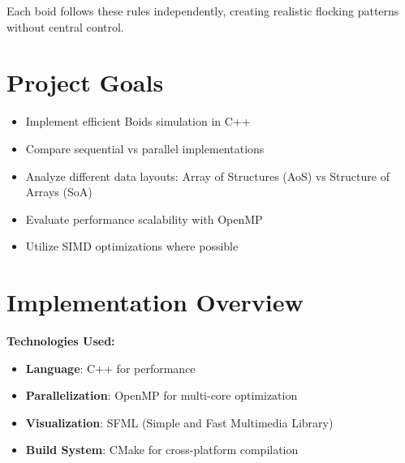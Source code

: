 \vspace{0.5cm}
Each boid follows these rules independently, creating realistic flocking patterns without central control.

\section{Project Goals}

\begin{itemize}
    \item Implement efficient Boids simulation in C++
    \item Compare sequential vs parallel implementations
    \item Analyze different data layouts: Array of Structures (AoS) vs Structure of Arrays (SoA)
    \item Evaluate performance scalability with OpenMP
    \item Utilize SIMD optimizations where possible
\end{itemize}

\section{Implementation Overview}

\textbf{Technologies Used:}
\begin{itemize}
    \item \textbf{Language}: C++ for performance
    \item \textbf{Parallelization}: OpenMP for multi-core optimization
    \item \textbf{Visualization}: SFML (Simple and Fast Multimedia Library)
    \item \textbf{Build System}: CMake for cross-platform compilation
\end{itemize}

